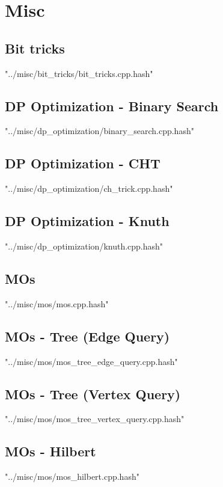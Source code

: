 \documentclass [12pt,onecolumn,oneside]{article}
\begin{document}
\section{Misc}
\subsection{ Bit tricks}
 {"../misc/bit_tricks/bit_tricks.cpp.hash"}
\newpage

\subsection{ DP Optimization - Binary Search}
 {"../misc/dp_optimization/binary_search.cpp.hash"}
\newpage

\subsection{ DP Optimization - CHT}
 {"../misc/dp_optimization/ch_trick.cpp.hash"}
\newpage

\subsection{ DP Optimization - Knuth}
 {"../misc/dp_optimization/knuth.cpp.hash"}
\newpage

\subsection{ MOs}
 {"../misc/mos/mos.cpp.hash"}
\newpage

\subsection{ MOs - Tree (Edge Query)}
 {"../misc/mos/mos_tree_edge_query.cpp.hash"}
\newpage

\subsection{ MOs - Tree (Vertex Query)}
 {"../misc/mos/mos_tree_vertex_query.cpp.hash"}
\newpage

\subsection{ MOs - Hilbert}
 {"../misc/mos/mos_hilbert.cpp.hash"}
\newpage
\end{document}
